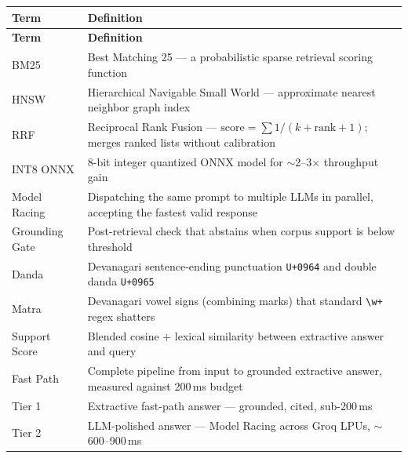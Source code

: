 \documentclass[12pt,a4paper]{article}
\begin{document}
\begin{longtable}{lp{10cm}}
\toprule
\textbf{Term} & \textbf{Definition} \\
\midrule
\endfirsthead
\textbf{Term} & \textbf{Definition} \\
\midrule
\endhead
\bottomrule
\endfoot
BM25          & Best Matching 25 --- a probabilistic sparse retrieval scoring function \\
HNSW          & Hierarchical Navigable Small World --- approximate nearest neighbor graph index \\
RRF           & Reciprocal Rank Fusion --- $\text{score} = \sum 1/(k + \text{rank} + 1)$; merges ranked lists without calibration \\
INT8 ONNX     & 8-bit integer quantized ONNX model for $\sim$2--3$\times$ throughput gain \\
Model Racing  & Dispatching the same prompt to multiple LLMs in parallel, accepting the fastest valid response \\
Grounding Gate & Post-retrieval check that abstains when corpus support is below threshold \\
Danda         & Devanagari sentence-ending punctuation \texttt{U+0964} and double danda \texttt{U+0965} \\
Matra         & Devanagari vowel signs (combining marks) that standard \texttt{\textbackslash w+} regex shatters \\
Support Score & Blended cosine + lexical similarity between extractive answer and query \\
Fast Path     & Complete pipeline from input to grounded extractive answer, measured against 200\,ms budget \\
Tier 1        & Extractive fast-path answer --- grounded, cited, sub-200\,ms \\
Tier 2        & LLM-polished answer --- Model Racing across Groq LPUs, $\sim$600--900\,ms \\
\end{longtable}
\end{document}
